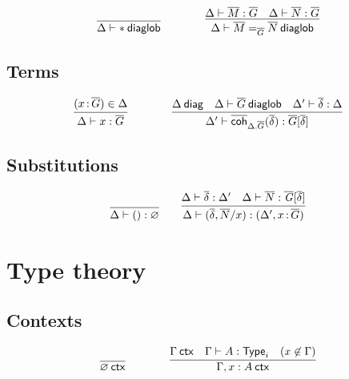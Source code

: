 \begin{small}
  \[
  \infer{\wfdiaglob{\Delta}{\diagbase}}
  {}%
  \qquad\qquad
  \infer{\wfdiaglob{\Delta}{\homj{\diag G}{\diag M}{\diag N}}}
  {\ofdiaglob{\Delta}{\diag M}{\diag G}
    & \ofdiaglob{\Delta}{\diag N}{\diag G}}
  \]
\end{small}

\subsection{Terms}

\begin{small}
  \[
  \infer{\ofdiaglob{\Delta}{x}{\diag G}}
  {(\tptm{x}{\diag G})\in\Delta}
  \qquad\qquad
  \infer{\ofdiaglob{\Delta'}{\diagcoh{\Delta.\diag G}{\diag\delta}}
    {\diag G[\diag\delta]}}
  {\wfdiag{\Delta} 
    & \wfdiaglob{\Delta}{\diag G}
    & \substdiaglob{\Delta'}{\diag\delta}{\Delta}}
  \]
\end{small}

\subsection{Substitutions}

\begin{small}
  \[
  \infer{\substdiaglob{\Delta}{()}{\emptyctx}}
  {}
  \qquad
  \infer{\substdiaglob{\Delta}{(\diag \delta,\diag N/x)}
    {(\Delta',\tptm{x}{\diag G})}}
  {\substdiaglob{\Delta}{\diag \delta}{\Delta'}
    & \ofdiaglob{\Delta}{\diag N}{\tsubst{\diag G}{\diag \delta}}}
  \]
\end{small}

\section{Type theory}

\subsection{Contexts}

\begin{small}
  \[
  \infer{\wfctx{\varnothing}}{}
  \qquad\qquad
  \infer{\wfctx{\Gamma,x:A}}
  {\wfctx{\Gamma}
    & \wftype{\Gamma}{A}
    & (x\not\in\Gamma)}
  \]
\end{small}


